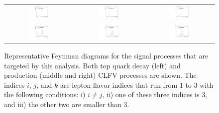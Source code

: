  \begin{figure}[tbh!]
 \begin{center}
 \begin{tabular}{ccc}
 \includegraphics[width=0.33\textwidth]{figures/Part4/Signal/llM_emu}&
 \includegraphics[width=0.33\textwidth]{figures/Part4/Signal/llM_etau}&
 \includegraphics[width=0.33\textwidth]{figures/Part4/Signal/llM_mutau}\\
  \includegraphics[width=0.33\textwidth]{figures/Part4/Signal/llDr_emu}&
 \includegraphics[width=0.33\textwidth]{figures/Part4/Signal/llDr_etau}&
 \includegraphics[width=0.33\textwidth]{figures/Part4/Signal/llDr_mutau}\\
 \end{tabular}
 \caption{Representative Feynman diagrams for the signal processes that are targeted by this analysis. Both top quark decay (left) and production (middle and right) \ac{CLFV} processes are shown. The indices $i$,  $j$, and $k$ are lepton flavor indices that run from 1 to 3 with the following conditions: i) $i\neq j$, ii) one of these three indices is 3, and iii) the other two are smaller than 3.}
 \label{fig:SigGen}
 \end{center}
 \end{figure}

